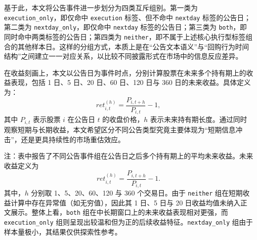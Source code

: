 \documentclass[a4paper,10pt]{article}
\begin{document}
基于此，本文将公告事件进一步划分为四类互斥组别。第一类为 \texttt{execution\_only}，即仅命中 \texttt{execution} 标签、但不命中 \texttt{nextday} 标签的公告日；第二类为 \texttt{nextday\_only}，即仅命中 \texttt{nextday} 标签的公告日；第三类为 \texttt{both}，即同时命中两类标签的公告日；第四类为 \texttt{neither}，即不属于上述核心执行型标签组合的其他样本日。这样的分组方式，本质上是在“公告文本语义”与“回购行为时间结构”之间建立一一对应关系，以比较不同披露形式在市场中的信息反应差异。

在收益刻画上，本文以公告日为事件时点，分别计算股票在未来多个持有期上的收益表现，包括 1 日、5 日、20 日、60 日、120 日与 360 日的未来收益。具体定义为：
\[
ret_{i,t}^{(h)} = \frac{P_{i,t+h}}{P_{i,t}} - 1,
\]
其中 \(P_{i,t}\) 表示股票 \(i\) 在公告日 \(t\) 的收盘价格，\(h\) 表示未来持有期长度。通过同时观察短期与长期收益，本文希望区分不同公告类型究竟主要体现为“短期信息冲击”，还是更具持续性的市场重估效应。


\begin{table}[H]
\centering
\caption{不同公告事件组的未来收益均值}
\label{tab:post_event_return_summary}
\begin{tablenotes}
\small
\item 注：表中报告了不同公告事件组在公告日之后多个持有期上的平均未来收益。未来收益定义为
\[
ret_{i,t}^{(h)} = \frac{P_{i,t+h}}{P_{i,t}} - 1.
\]
其中，\(h\) 分别取 1、5、20、60、120 与 360 个交易日。由于 \texttt{neither} 组在短期收益计算中存在异常值（如无穷值），因此其 1 日、5 日与 20 日收益均值未纳入正文展示。整体上看，\texttt{both} 组在中长期窗口上的未来收益表现相对更强，而 \texttt{execution\_only} 组则呈现出较温和但为正的后续收益特征。\texttt{nextday\_only} 组由于样本量极小，其结果仅供探索性参考。
\end{tablenotes}
\end{table}
\end{document}
